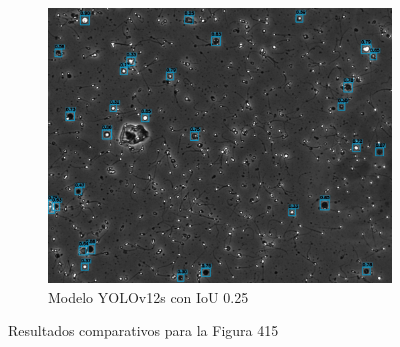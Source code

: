 \documentclass[12pt,a4paper,onecolumn,oneside]{report}
\begin{document}
\begin{figure}[H]
  \vspace{0.3cm}
  \begin{subfigure}[b]{0.48\textwidth}
    \centering
    \includegraphics[width=\textwidth]{figuras/evaluacion_cualitativa/415/415_v12_IoU0.25.jpg}
    \caption{Modelo YOLOv12s con IoU 0.25}
    \label{figyolov12s_IoU0.25_image_415}
  \end{subfigure}
  
  \caption{Resultados comparativos para la Figura 415}
  \label{fig:415}
\end{figure}
\end{document}
